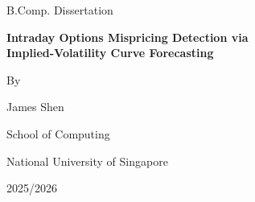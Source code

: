 \documentclass[12pt]{report}
\begin{document}
\hypersetup{pageanchor=false}

\begin{titlepage}
\thispagestyle{empty}
\centering

\vspace*{2.2cm}

{\Large B.Comp. Dissertation\par}
\vspace{1.6cm}

{\Huge\bfseries Intraday Options Mispricing Detection via\\[0.25em]
Implied-Volatility Curve Forecasting\par}

\vspace{1.8cm}

{\Large By\par}
\vspace{0.4cm}
{\Large James Shen\par}

\vfill

{\large School of Computing\par}
{\large National University of Singapore\par}

\vspace{1.2cm}

{\large 2025/2026\par}

\end{titlepage}
\end{document}
